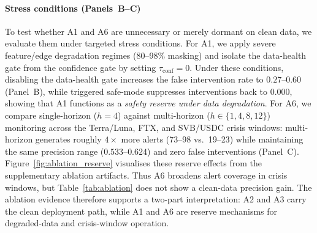 \paragraph{Stress conditions (Panels~B--C)} To test whether A1 and A6 are unnecessary or merely dormant on clean data, we evaluate them under targeted stress conditions. For A1, we apply severe feature/edge degradation regimes (80--98\% masking) and isolate the data-health gate from the confidence gate by setting $\tau_{\mathrm{conf}}=0$. Under these conditions, disabling the data-health gate increases the false intervention rate to $0.27$--$0.60$ (Panel~B), while triggered safe-mode suppresses interventions back to $0.000$, showing that A1 functions as a \emph{safety reserve under data degradation}. For A6, we compare single-horizon ($h=4$) against multi-horizon ($h\in\{1,4,8,12\}$) monitoring across the Terra/Luna, FTX, and SVB/USDC crisis windows: multi-horizon generates roughly $4\times$ more alerts (73--98 vs.\ 19--23) while maintaining the same precision range ($0.533$--$0.624$) and zero false interventions (Panel~C). Figure~\ref{fig:ablation_reserve} visualises these reserve effects from the supplementary ablation artifacts. Thus A6 broadens alert coverage in crisis windows, but Table~\ref{tab:ablation} does not show a clean-data precision gain. The ablation evidence therefore supports a two-part interpretation: A2 and A3 carry the clean deployment path, while A1 and A6 are reserve mechanisms for degraded-data and crisis-window operation.
